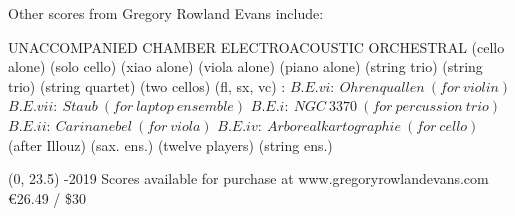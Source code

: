 \documentclass[10pt]{article}
\begin{document}

\begin{center}
\fontsize{.7cm}{1em}\selectfont Other scores from Gregory Rowland Evans include: \hfill
\end{center}
\vspace*{4\baselineskip}
{
\begin{center}
\setlength{\columnseprule}{1pt}
\setlength{\columnsep}{6em}

\begin{paracol}{4}
\fontsize{.4cm}{1em}\selectfont UNACCOMPANIED
\switchcolumn[1]
\fontsize{.4cm}{1em}\selectfont CHAMBER
\switchcolumn[2]
\fontsize{.4cm}{1em}\selectfont ELECTROACOUSTIC
\switchcolumn[3]
\fontsize{.4cm}{1em}\selectfont ORCHESTRAL
\switchcolumn[0]
\fontsize{.1cm}{0.5em}  (cello alone)
\switchcolumn[0]
\hfill
\switchcolumn[0]
\fontsize{.1cm}{0.5em}  (solo cello)
\switchcolumn[0]
\hfill
 \switchcolumn[0]
\fontsize{.1cm}{0.5em}  (xiao alone)
\switchcolumn[0]
\hfill
\switchcolumn[0]
\fontsize{.1cm}{0.5em}  (viola alone)
\switchcolumn[0]
\hfill
\switchcolumn[0]
\fontsize{.1cm}{0.5em}  (piano alone)
\switchcolumn[1]
\fontsize{.1cm}{0.5em} 
\switchcolumn[1]
\hfill
\switchcolumn[1]
\fontsize{.1cm}{0.5em}  (string trio)
\switchcolumn[1]
\hfill
\switchcolumn[1]
\fontsize{.1cm}{0.5em}  (string trio)
\switchcolumn[1]
\hfill
\switchcolumn[1]
\fontsize{.1cm}{0.5em}  (string quartet)
\switchcolumn[1]
\hfill
\switchcolumn[1]
\fontsize{.1cm}{0.5em}  (two cellos)
\switchcolumn[1]
\hfill
\switchcolumn[1]
\fontsize{.1cm}{0.5em}  (fl, sx, vc)
\switchcolumn[2]
\fontsize{.1cm}{0.5em} :
\switchcolumn[2]
\fontsize{.05cm}{0.5em}  $B.E.vi: \ Ohrenquallen \ (for \ violin)$
\switchcolumn[2]
\fontsize{.05cm}{0.5em}  $B.E.vii: \ Staub \ (for \ laptop \ ensemble)$
\switchcolumn[2]
\fontsize{.05cm}{0.5em}  $B.E.i: \ NGC \ 3370 \ (for \ percussion \ trio)$
\switchcolumn[2]
\fontsize{.05cm}{0.5em}  $B.E.ii: \ Carinanebel \ (for \ viola)$
\switchcolumn[2]
 \fontsize{.05cm}{0.5em} $B.E.iv: \ Arborealkartographie \ (for \ cello)$
\switchcolumn[3]
\fontsize{.1cm}{0.5em}  (after Illouz)
\switchcolumn[3]
\hfill
\switchcolumn[3]
\fontsize{.1cm}{0.5em}  (sax. ens.)
\switchcolumn[3]
\hfill
\switchcolumn[3]
\fontsize{.1cm}{0.5em}  (twelve players)
\switchcolumn[3]
\hfill
\switchcolumn[3]
\fontsize{.1cm}{0.5em}  (string ens.)


\end{paracol}
\end{center}
}

\begin{textblock}{23}(0, 23.5)
-2019 \hfill
Scores available for purchase at www.gregoryrowlandevans.com \hfill
\euro 26.49 / \$30
\end{textblock}
\end{document}
